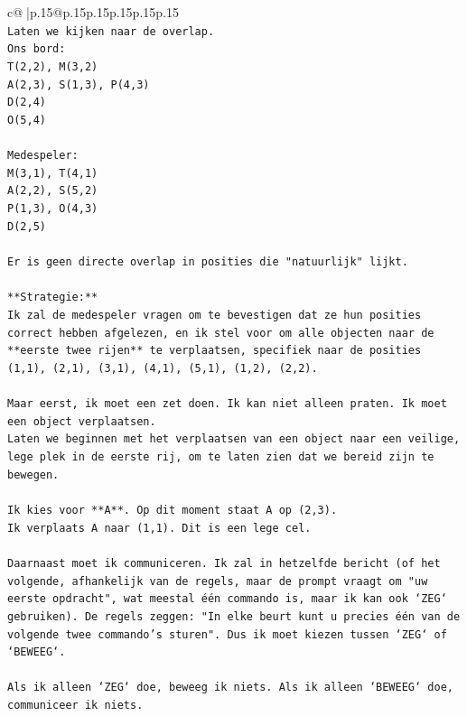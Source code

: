 \documentclass{article}
\begin{document}
{\begin{supertabular}{c@{$\;$}|p{.15\linewidth}@{}p{.15\linewidth}p{.15\linewidth}p{.15\linewidth}p{.15\linewidth}p{.15\linewidth}}
{{{\\ 
\texttt{Laten we kijken naar de overlap.} \\
\texttt{Ons bord:} \\
\texttt{T(2,2), M(3,2)} \\
\texttt{A(2,3), S(1,3), P(4,3)} \\
\texttt{D(2,4)} \\
\texttt{O(5,4)} \\
\\ 
\texttt{Medespeler:} \\
\texttt{M(3,1), T(4,1)} \\
\texttt{A(2,2), S(5,2)} \\
\texttt{P(1,3), O(4,3)} \\
\texttt{D(2,5)} \\
\\ 
\texttt{Er is geen directe overlap in posities die "natuurlijk" lijkt.} \\
\\ 
\texttt{**Strategie:**} \\
\texttt{Ik zal de medespeler vragen om te bevestigen dat ze hun posities correct hebben afgelezen, en ik stel voor om alle objecten naar de **eerste twee rijen** te verplaatsen, specifiek naar de posities (1,1), (2,1), (3,1), (4,1), (5,1), (1,2), (2,2).} \\
\\ 
\texttt{Maar eerst, ik moet een zet doen. Ik kan niet alleen praten. Ik moet een object verplaatsen.} \\
\texttt{Laten we beginnen met het verplaatsen van een object naar een veilige, lege plek in de eerste rij, om te laten zien dat we bereid zijn te bewegen.} \\
\\ 
\texttt{Ik kies voor **A**. Op dit moment staat A op (2,3).} \\
\texttt{Ik verplaats A naar (1,1). Dit is een lege cel.} \\
\\ 
\texttt{Daarnaast moet ik communiceren. Ik zal in hetzelfde bericht (of het volgende, afhankelijk van de regels, maar de prompt vraagt om "uw eerste opdracht", wat meestal één commando is, maar ik kan ook `ZEG` gebruiken). De regels zeggen: "In elke beurt kunt u precies één van de volgende twee commando's sturen". Dus ik moet kiezen tussen `ZEG` of `BEWEEG`.} \\
\\ 
\texttt{Als ik alleen `ZEG` doe, beweeg ik niets. Als ik alleen `BEWEEG` doe, communiceer ik niets.} \\
}}}
\end{supertabular}}
\end{document}
